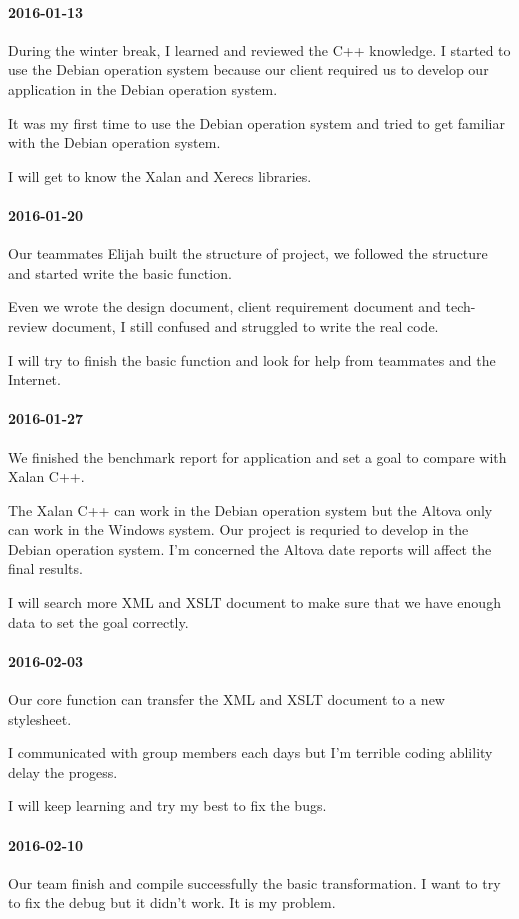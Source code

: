 \paragraph{2016-01-13}
During the winter break, I learned and reviewed the C++ knowledge. I started to use the Debian operation system because our client required us to develop our application in the Debian operation system.

It was my first time to use the Debian operation system and tried to get familiar with the Debian operation system.

I will get to know the Xalan and Xerecs libraries.
\paragraph{2016-01-20}
Our teammates Elijah built the structure of project, we followed the structure and started write the basic function.

Even we wrote the design document, client requirement document and tech-review document, I still confused and struggled to write the real code.

I will try to finish the basic function and look for help from teammates and the Internet.
\paragraph{2016-01-27}
We finished the benchmark report for application and set a goal to compare with Xalan C++.

The Xalan C++ can work in the Debian operation system but the Altova only can work in the Windows system. Our project is requried to develop in the Debian operation system. I'm concerned the Altova date reports will affect the final results.

I will search more XML and XSLT document to make sure that we have enough data to set the goal correctly.
\paragraph{2016-02-03}
Our core function can transfer the XML and XSLT document to a new stylesheet.

I communicated with group members each days but I'm terrible coding ablility delay the progess.

I will keep learning and try my best to fix the bugs.
\paragraph{2016-02-10}
Our team finish and compile successfully the basic transformation. I want to try to fix the debug but it didn't work. It is my problem.

